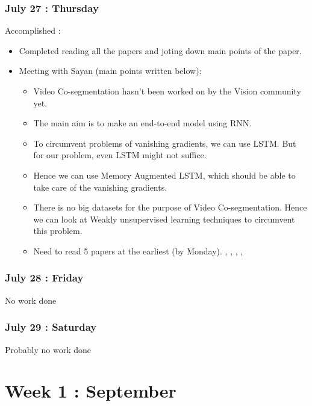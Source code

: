\documentclass{article}
\begin{document}
\subsubsection{July 27 : Thursday}
Accomplished :
\begin{itemize}
\item Completed reading all the papers and joting down main points of the paper.
\item Meeting with Sayan (main points written below):
  \begin{itemize}
  \item Video Co-segmentation hasn't been worked on by the Vision community yet.
  \item The main aim is to make an end-to-end model using RNN.
  \item To circumvent problems of vanishing gradients, we can use LSTM. But for our problem, even LSTM might not suffice.
  \item Hence we can use Memory Augmented LSTM, which should be able to take care of the vanishing gradients.
  \item There is no big datasets for the purpose of Video Co-segmentation. Hence we can look at Weakly unsupervised learning techniques to circumvent this problem.
  \item Need to read 5 papers at the earliest (by Monday). \cite{DBLP:journals/corr/SiamVJR16}, \cite{DBLP:journals/corr/JainZSS15}, \cite{PAVEL2017105}, \cite{DBLP:journals/corr/NohHH15}, \cite{DBLP:journals/corr/GulcehreCB17}
  \end{itemize}
\end{itemize}

\subsubsection{July 28 : Friday}
No work done

\subsubsection{July 29 : Saturday}
Probably no work done

\section{Week 1 : September}
\end{document}
